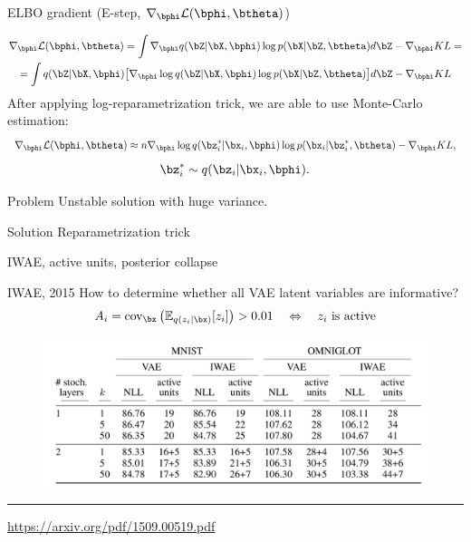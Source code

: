 \begin{frame}{ELBO gradient (E-step, $\nabla_{\bphi} \mathcal{L}(\bphi, \btheta)$)}

	\begin{multline*}
		\nabla_{\bphi} \mathcal{L} (\bphi, \btheta) = \int \nabla_{\bphi} q(\bZ| \bX, \bphi) \log p(\bX |\bZ, \btheta) d\bZ  - \nabla_{\bphi} KL = \\ 
		=  \int q(\bZ| \bX, \bphi) \bigl[  \nabla_{\bphi} \log q(\bZ| \bX, \bphi) \log p(\bX |\bZ, \btheta) \bigr] d\bZ - \nabla_{\bphi} KL
	\end{multline*}
	After applying log-reparametrization trick, we are able to use Monte-Carlo estimation:
	\[
		\nabla_{\bphi} \mathcal{L} (\bphi, \btheta) \approx n \nabla_{\bphi} \log q(\bz_i^*| \bx_i, \bphi) \log p(\bx_i |\bz_i^*, \btheta) - \nabla_{\bphi} KL,
	\]
	\[
		\bz_i^* \sim q(\bz_i| \bx_i, \bphi).
	\]
	\vspace{-0.2cm}
	\begin{block}{Problem} 
	Unstable solution with huge variance.
	\end{block}
	\begin{block}{Solution}
	    Reparametrization trick
	\end{block}
\end{frame}
\begin{frame}{IWAE, active units, posterior collapse}
\end{frame}
\begin{frame}{IWAE, 2015}
How to determine whether all VAE latent variables are informative?
\[
A_{i} = \text{cov}_\bx \left( \mathbb{E}_{q(z_i | \bx)} [z_i] \right) > 0.01 \quad \Leftrightarrow \quad z_i \text{ is active}
\]
\begin{figure}
	\centering
	\includegraphics[width=\linewidth]{figs/IWAE_3.png}
\end{figure}
\vfill
\hrule\medskip
{\scriptsize \href{https://arxiv.org/pdf/1509.00519.pdf}{https://arxiv.org/pdf/1509.00519.pdf}}
\end{frame}
